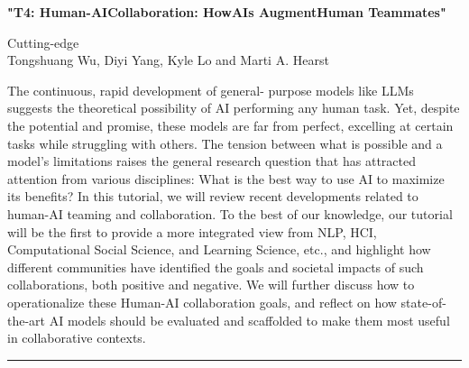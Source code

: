 \begin{center}
    \Large{\textbf{"T4: Human-AICollaboration: HowAIs AugmentHuman Teammates"}\\}
    \par\bigskip
    \large{Cutting-edge}\\
    \large{Tongshuang Wu, Diyi Yang, Kyle Lo and Marti A. Hearst}\\
    \par\bigskip

\end{center}

The continuous, rapid development of general- purpose models like LLMs suggests the theoretical possibility of AI performing any human task. 
Yet, despite the potential and promise, these models are far from perfect, excelling at certain tasks while struggling with others. 
The tension between what is possible and a model's limitations raises the general research question that has attracted attention from various disciplines: What is the best way to use AI to maximize its benefits? In this tutorial, we will review recent developments related to human-AI teaming and collaboration. 
To the best of our knowledge, our tutorial will be the first to provide a more integrated view from NLP, HCI, Computational Social Science, and Learning Science, etc., and highlight how different communities have identified the goals and societal impacts of such collaborations, both positive and negative. We will further discuss how to operationalize these Human-AI collaboration goals, and reflect on how state-of-the-art AI models should be evaluated and scaffolded to make them most useful in collaborative contexts.
\begin{center}
    \noindent\rule{200px}{1pt}
\end{center}
